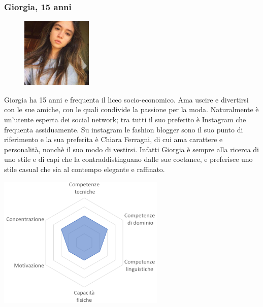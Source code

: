 \documentclass[12pt,a4paper]{report}
\begin{document}
\subsubsection*{Giorgia, 15 anni}
\begin{figure}
  \centering
    \includegraphics[width=0.3\textwidth]{"Images Latex/Personas/Giorgia"}
\end{figure}
Giorgia ha 15 anni e frequenta il liceo socio-economico. Ama uscire e divertirsi con le sue amiche, con le quali condivide la passione per la moda. Naturalmente è un'utente esperta dei social network; tra tutti il suo preferito è Instagram che frequenta assiduamente. Su instagram le fashion blogger sono il suo punto di riferimento e la sua preferita è Chiara Ferragni, di cui ama carattere e personalità, nonchè il suo modo di vestirsi. Infatti Giorgia è sempre alla ricerca di uno stile e di capi che la contraddistinguano dalle sue coetanee, e preferisce uno stile casual che sia al contempo elegante e raffinato.
\begin{center}
  \includegraphics[width=0.6\textwidth]{"Images Latex/Personas/Giorgia15"}
\end{center}
\newpage
\end{document}
